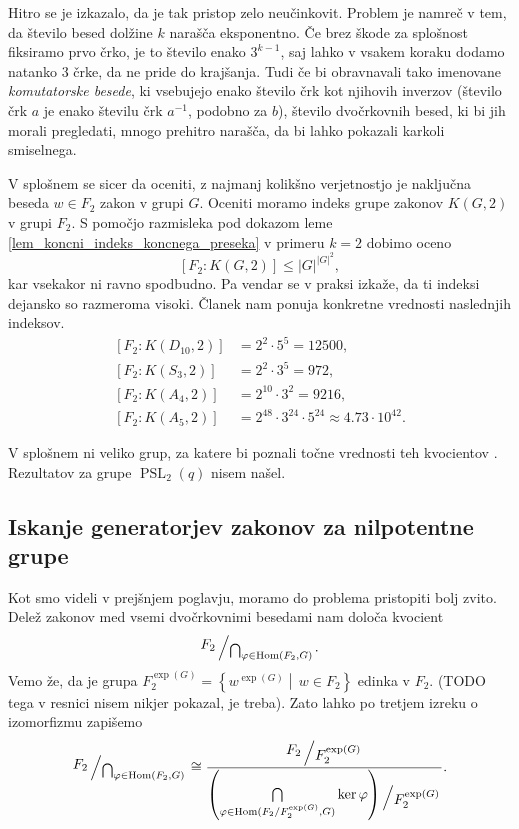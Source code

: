 Hitro se je izkazalo, da je tak pristop zelo neučinkovit. Problem je namreč v tem, da število besed dolžine $k$ narašča eksponentno. Če brez škode za splošnost fiksiramo prvo črko, je to število enako $3^{k - 1}$,
saj lahko v vsakem koraku dodamo natanko 3 črke, da ne pride do krajšanja. Tudi če bi obravnavali tako imenovane \emph{komutatorske besede}, ki vsebujejo enako število črk kot njihovih inverzov (število črk $a$ je enako številu črk $a^{-1}$, podobno za $b$),
število dvočrkovnih besed, ki bi jih morali pregledati, mnogo prehitro narašča, da bi lahko pokazali karkoli smiselnega.

V splošnem se sicer da oceniti, z najmanj kolikšno verjetnostjo je naključna beseda $w \in F_2$ zakon v grupi $G$.
Oceniti moramo indeks grupe zakonov $K(G, 2)$ v grupi $F_2$. S pomočjo razmisleka pod dokazom leme \ref{lem_koncni_indeks_koncnega_preseka} v primeru $k  = 2$ dobimo oceno
\begin{equation*}
    \left[ F_2 : K(G, 2) \right] \le {\lvert G \rvert}^{{\lvert G \rvert}^2},
    \end{equation*}  
kar vsekakor ni ravno spodbudno. Pa vendar se v praksi izkaže, da ti indeksi dejansko so razmeroma visoki. Članek \cite{Cocke_2020} nam ponuja konkretne vrednosti naslednjih indeksov.
\begin{align*}
    \left[ F_2 : K(D_{10}, 2) \right] &= 2^2 \cdot 5^{5} = 12500, \\
    \left[ F_2 : K(S_3, 2) \right] &= 2^2 \cdot 3^{5} = 972, \\
    \left[ F_2 : K(A_4, 2) \right] &= 2^{10} \cdot  3^{2} = 9216, \\
    \left[ F_2 : K(A_5, 2) \right] &= 2^{48} \cdot  3^{24} \cdot 5^{24} \approx 4.73 \cdot 10^{42}.   %
\end{align*}

V splošnem ni veliko grup, za katere bi poznali točne vrednosti teh kvocientov \cite[str.~1]{Cocke_2020}. Rezultatov za grupe $\operatorname{PSL}_2(q)$ nisem našel.

\subsection{Iskanje generatorjev zakonov za nilpotentne grupe}

Kot smo videli v prejšnjem poglavju, moramo do problema pristopiti bolj zvito. Delež zakonov med vsemi dvočrkovnimi besedami nam določa kvocient \begin{equation*}
\bigslant{F_2}{\bigcap_{\varphi \in \operatorname{Hom}(F_2, G)}}.  
\end{equation*}  
Vemo že, da je grupa $F_2^{\exp(G)} = \left\{ w^{\exp(G)}  \middle|\, w \in F_2 \right\}$ edinka v $F_2$. (TODO tega v resnici nisem nikjer pokazal, je treba).
Zato lahko po tretjem izreku o izomorfizmu zapišemo 
\begin{equation*}
    \bigslant{F_2}{\bigcap_{\varphi \in \operatorname{Hom}(F_2, G)}} \cong \dfrac{\bigslant{F_2}{F_2^{\exp(G)}}}{\bigslant{ \left( \bigcap\limits_{\varphi \in \operatorname{Hom}({F_2} / {F_2^{\exp(G)}}, G)} \ker \varphi \right) }{F_2^{\exp(G)}}}.
\end{equation*}  
  
